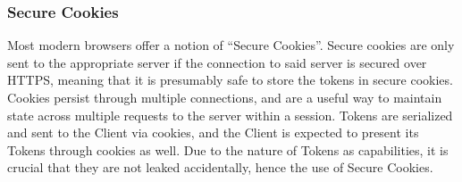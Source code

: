 \documentclass{article}
\begin{document}
\subsubsection{Secure Cookies}
\label{ssub:secure_cookies}
\par Most modern browsers offer a notion of ``Secure Cookies''. Secure cookies are only sent to the appropriate server if the connection to said server is secured over HTTPS, meaning that it is presumably safe to store the tokens in secure cookies. Cookies persist through multiple connections, and are a useful way to maintain state across multiple requests to the server within a session. Tokens are serialized and sent to the Client via cookies, and the Client is expected to present its Tokens through cookies as well. Due to the nature of Tokens as capabilities, it is crucial that they are not leaked accidentally, hence the use of Secure Cookies.
\end{document}
